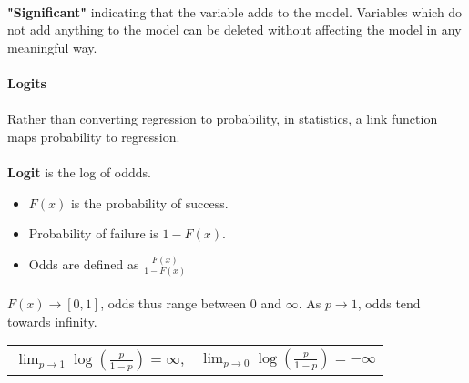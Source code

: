 \documentclass[letterpaper,12pt]{article}
\begin{document}
\paragraph{}\textbf{"Significant"} indicating that the variable adds to the model. Variables
which do not add anything to the model can be deleted without affecting the model in any meaningful
way.
\paragraph{Logits}
\paragraph{}Rather than converting regression to probability, in statistics, a link function maps
probability to regression.
\paragraph{} \textbf{Logit} is the log of oddds.
\begin{itemize}
    \item $F(x)$ is the probability of success.
    \item Probability of failure is $1-F(x)$.
    \item Odds are defined as $\frac{F(x)}{1-F(x)}$
\end{itemize}

\paragraph{}$F(x) \to [0,1]$, odds thus range between 0 and $\infty$. As $p \to 1$, odds tend
towards infinity.
\begin{table}[htpb]
    \centering
    \label{tab:label}
    \begin{tabular}{l r}
    $\displaystyle\lim_{p \to 1}\log(\frac{p}{1-p}) = \infty$, &      
    $\displaystyle\lim_{p \to 0}\log(\frac{p}{1-p}) = -\infty$ 
    \end{tabular}
\end{table}
\end{document}
